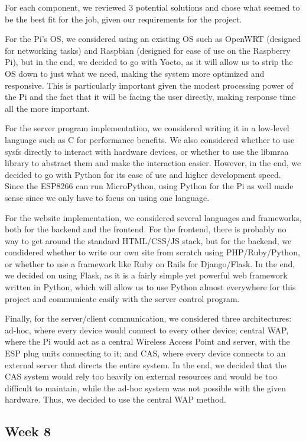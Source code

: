 \documentclass[letterpaper,10pt]{article}
\begin{document}
For each component, we reviewed 3 potential solutions and chose what seemed to
be the best fit for the job, given our requirements for the project.

For the Pi's OS, we considered using an existing OS such as OpenWRT (designed
for networking tasks) and Raspbian (designed for ease of use on the Raspberry
Pi), but in the end, we decided to go with Yocto, as it will allow us to strip
the OS down to just what we need, making the system more optimized and
responsive.  This is particularly important given the modest processing power
of the Pi and the fact that it will be facing the user directly, making
response time all the more important.

For the server program implementation, we considered writing it in a low-level
language such as C for performance benefits.  We also considered whether to use
sysfs directly to interact with hardware devices, or whether to use the libmraa
library to abstract them and make the interaction easier.  However, in the end,
we decided to go with Python for its ease of use and higher development speed.
Since the ESP8266 can run MicroPython, using Python for the Pi as well made
sense since we only have to focus on using one language.

For the website implementation, we considered several languages and frameworks,
both for the backend and the frontend.  For the frontend, there is probably no
way to get around the standard HTML/CSS/JS stack, but for the backend, we
condidered whether to write our own site from scratch using PHP/Ruby/Python, or
whether to use a framework like Ruby on Rails for Django/Flask.  In the end, we
decided on using Flask, as it is a fairly simple yet powerful web framework
written in Python, which will allow us to use Python almost everywhere for this
project and communicate easily with the server control program.

Finally, for the server/client communication, we considered three
architectures: ad-hoc, where every device would connect to every other device;
central WAP, where the Pi would act as a central Wireless Access Point and
server, with the ESP plug units connecting to it; and CAS, where every device
connects to an external server that directs the entire system.  In the end, we
decided that the CAS system would rely too heavily on external resources and
would be too difficult to maintain, while the ad-hoc system was not possible
with the given hardware.  Thus, we decided to use the central WAP method.

\subsection{Week 8}
 
\end{document}
